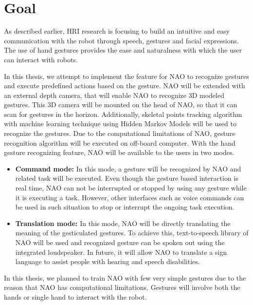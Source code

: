 \chapter{Goal}
As described earlier, HRI research is focusing to build an intuitive and easy communication with the robot through speech, gestures and facial expressions. The use of hand gestures provides the ease and naturalness with which the user can interact with robots.

In this thesis, we attempt to implement the feature for NAO to recognize gestures and execute predefined actions based on the gesture. NAO will be extended with an external depth camera, that will enable NAO to recognize 3D modeled gestures. This 3D camera will be mounted on the head of NAO, so that it can scan for gestures in the horizon.  Additionally, skeletal points tracking algorithm with machine learning technique using Hidden Markov Models will be used to recognize the gestures. Due to the computational limitations of NAO, gesture recognition algorithm will be executed on off-board computer. With the hand gesture recognizing feature, NAO will be available to the users in two modes.

\begin{itemize}
	\item \textbf{Command mode:} In this mode, a gesture will be recognized by NAO and related task will be executed. Even though the gesture based interaction is real time, NAO can not be interrupted or stopped by using any gesture while it is executing a task. However, other interfaces such as voice commands can be used in such situation to stop or interrupt the ongoing task execution.
	\item \textbf{Translation mode:} In this mode, NAO will be directly translating the meaning of the gesticulated gestures. To achieve this, text-to-speech library of NAO will be used and recognized gesture can be spoken out using the integrated loudspeaker. In future, it will allow NAO to translate a sign language to assist people with hearing and speech disabilities.
\end{itemize}

In this thesis, we planned to train NAO with few very simple gestures due to the reason that NAO has computational limitations. Gestures will involve both the hands or single hand to interact with the robot.
